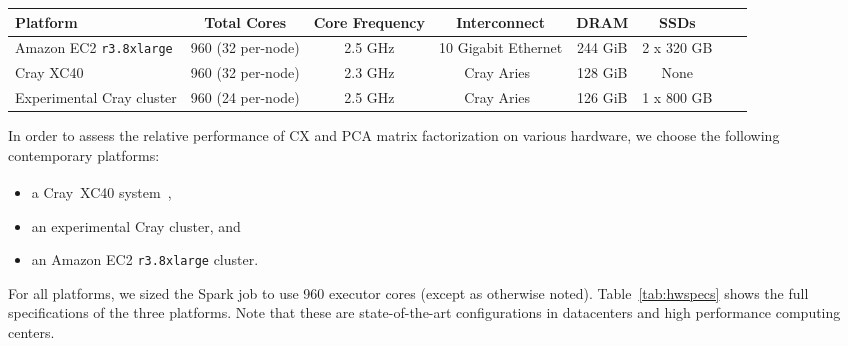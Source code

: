   \begin{table*}
    \begin{center}
    \begin{tabular}{| l | c | c | c | c | c | c | c |}
    \toprule
    \textbf{Platform} & \textbf{Total Cores} & \textbf{Core Frequency} & \textbf{Interconnect} & \textbf{DRAM} & \textbf{SSDs} \\
    \midrule
    Amazon EC2 \texttt{r3.8xlarge} & 960 (32 per-node) & 2.5 GHz & 10 Gigabit Ethernet & 244 GiB & 2 x 320 GB \\
    \midrule
    Cray XC40 & 960 (32 per-node) & 2.3 GHz & Cray Aries~\cite{alverson2012cray,craycascadesc12} & 128 GiB & None \\
    \midrule
    Experimental Cray cluster & 960 (24 per-node) & 2.5 GHz & Cray Aries~\cite{alverson2012cray,craycascadesc12} & 126 GiB & 1 x 800 GB \\
    \bottomrule
    \end{tabular}
    \end{center}
    \caption{Specifications of the three hardware platforms used in these performance experiments.}
    \label{tab:hwspecs}
  \end{table*}

 In order to assess the relative performance of CX and PCA matrix factorization on various hardware, we choose the following contemporary platforms:
 \begin{itemize}
 \item a Cray\textregistered~XC40\textsuperscript{\tiny\texttrademark}
 system~\cite{alverson2012cray,craycascadesc12},
 \item an experimental Cray cluster, and
 \item an Amazon EC2 \texttt{r3.8xlarge} cluster.
 \end{itemize}

 For all platforms, we sized the Spark job to use 960 executor cores (except as
 otherwise noted).  Table~\ref{tab:hwspecs} shows the full specifications of
 the three platforms. Note that these are state-of-the-art configurations in
 datacenters and high performance computing centers. 

